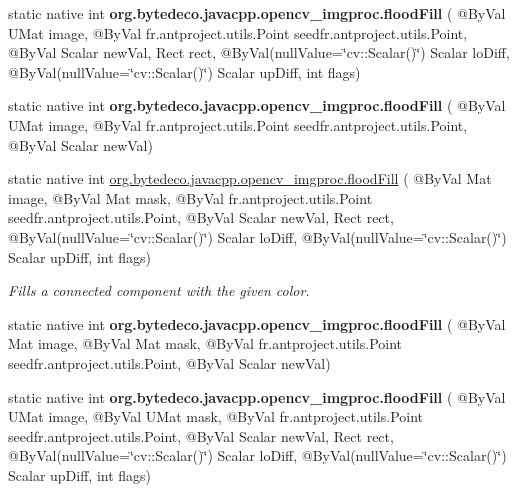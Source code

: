 \begin{DoxyCompactItemize}
static native int {\bfseries org.\+bytedeco.\+javacpp.\+opencv\+\_\+imgproc.\+flood\+Fill} ( @By\+Val U\+Mat image, @By\+Val fr.antproject.utils.Point seed\+fr.antproject.utils.Point, @By\+Val Scalar new\+Val, Rect rect, @By\+Val(null\+Value=\char`\"{}cv\+::\+Scalar()\char`\"{}) Scalar lo\+Diff, @By\+Val(null\+Value=\char`\"{}cv\+::\+Scalar()\char`\"{}) Scalar up\+Diff, int flags)
\item 
\mbox{\label{group__imgproc__misc_gab28f9dea8929d8066aeb22f5fc51a06a}} 
static native int {\bfseries org.\+bytedeco.\+javacpp.\+opencv\+\_\+imgproc.\+flood\+Fill} ( @By\+Val U\+Mat image, @By\+Val fr.antproject.utils.Point seed\+fr.antproject.utils.Point, @By\+Val Scalar new\+Val)
\item 
static native int \hyperlink{group__imgproc__misc_gae1a712c481241605487f34e3b969f49c}{org.\+bytedeco.\+javacpp.\+opencv\+\_\+imgproc.\+flood\+Fill} ( @By\+Val Mat image, @By\+Val Mat mask, @By\+Val fr.antproject.utils.Point seed\+fr.antproject.utils.Point, @By\+Val Scalar new\+Val, Rect rect, @By\+Val(null\+Value=\char`\"{}cv\+::\+Scalar()\char`\"{}) Scalar lo\+Diff, @By\+Val(null\+Value=\char`\"{}cv\+::\+Scalar()\char`\"{}) Scalar up\+Diff, int flags)
\begin{DoxyCompactList}\small\item\em Fills a connected component with the given color. \end{DoxyCompactList}\item 
\mbox{\label{group__imgproc__misc_ga6bf5568d753264734416bfaac546dfc1}} 
static native int {\bfseries org.\+bytedeco.\+javacpp.\+opencv\+\_\+imgproc.\+flood\+Fill} ( @By\+Val Mat image, @By\+Val Mat mask, @By\+Val fr.antproject.utils.Point seed\+fr.antproject.utils.Point, @By\+Val Scalar new\+Val)
\item 
\mbox{\label{group__imgproc__misc_gae7e1b6b5e7d7b4f49431d284f3bbba28}} 
static native int {\bfseries org.\+bytedeco.\+javacpp.\+opencv\+\_\+imgproc.\+flood\+Fill} ( @By\+Val U\+Mat image, @By\+Val U\+Mat mask, @By\+Val fr.antproject.utils.Point seed\+fr.antproject.utils.Point, @By\+Val Scalar new\+Val, Rect rect, @By\+Val(null\+Value=\char`\"{}cv\+::\+Scalar()\char`\"{}) Scalar lo\+Diff, @By\+Val(null\+Value=\char`\"{}cv\+::\+Scalar()\char`\"{}) Scalar up\+Diff, int flags)
\item 
\mbox{\label{group__imgproc__misc_ga8b349da3adc83b3f06185c02aa4e767f}} 

\end{DoxyCompactItemize}
